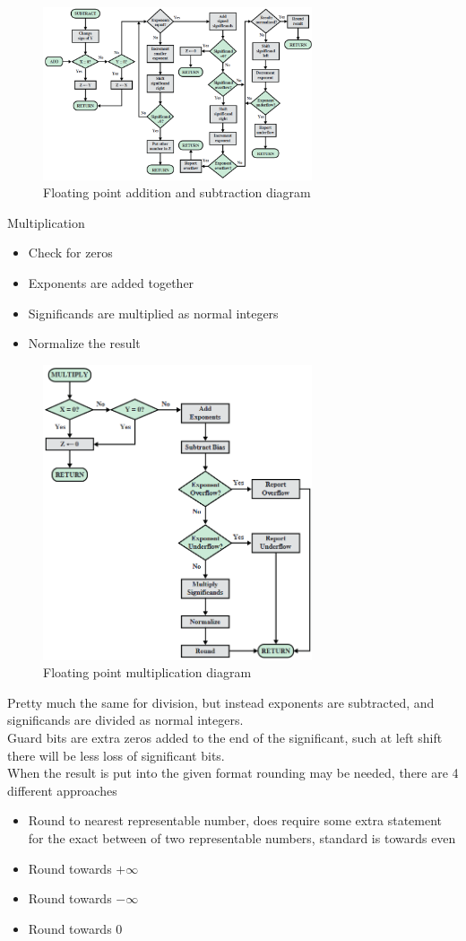 \documentclass[12pt, a4paper]{article}
\begin{document}
			\begin{figure}[h!]
				\includegraphics[width=300px]{assets/floatingpointAddSub.png}
				\centering
				\caption{Floating point addition and subtraction diagram}
			\end{figure}
			Multiplication
			\begin{itemize}
				\item Check for zeros
				\item Exponents are added together
				\item Significands are multiplied as normal integers
				\item Normalize the result
			\end{itemize}
			\begin{figure}[h!]
				\includegraphics[width=300px]{assets/floatingpointMulti.png}
				\centering
				\caption{Floating point multiplication diagram}
			\end{figure}
			Pretty much the same for division, but instead exponents are subtracted, and significands are divided as normal integers.\\
			Guard bits are extra zeros added to the end of the significant, such at left shift there will be less loss of significant bits.\\
			When the result is put into the given format rounding may be needed, there are 4 different approaches
			\begin{itemize}
				\item Round to nearest representable number, does require some extra statement for the exact between of two representable numbers, standard is towards even
				\item Round towards $+\infty$
				\item Round towards $-\infty$
				\item Round towards 0
			\end{itemize}
\end{document}
